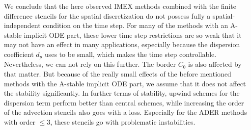 We conclude that the here observed IMEX methods combined with the finite difference stencils for the spatial discretization do not possess fully a spatial-independent condition on the time step. For many of the methods with an A-stable implicit ODE part, these lower time step restrictions are so weak that it may not have an effect in many applications, especially because the dispersion coefficient $d_p$ uses to be small, which makes the time step controllable. Nevertheless, we can not rely on this further. The border $C_0$ is also affected by that matter. But because of the really small effects of the before mentioned methods with the A-stable implicit ODE part, we assume that it does not affect the stability significantly. In further terms of stability, upwind schemes for the dispersion term perform better than central schemes, while increasing the order of the advection stencils also goes with a loss. Especially for the ADER methods with order $\le 3$, these stencils go with problematic instabilities.